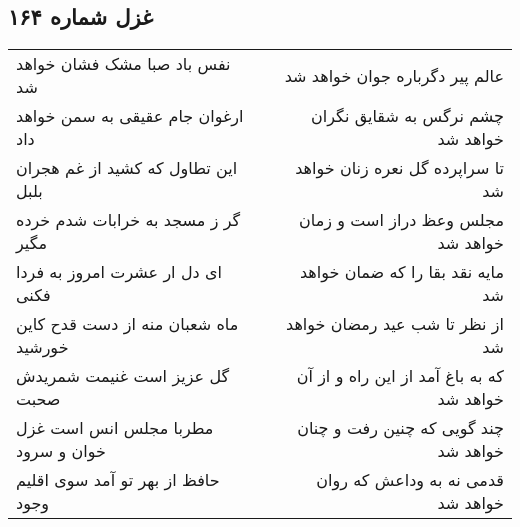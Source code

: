 \begin{center}
\section*{غزل شماره ۱۶۴}
\label{sec:sh164}
\begin{longtable}{l p{0.5cm} r}
نفس باد صبا مشک فشان خواهد شد
&&
عالم پیر دگرباره جوان خواهد شد
\\
ارغوان جام عقیقی به سمن خواهد داد
&&
چشم نرگس به شقایق نگران خواهد شد
\\
این تطاول که کشید از غم هجران بلبل
&&
تا سراپرده گل نعره زنان خواهد شد
\\
گر ز مسجد به خرابات شدم خرده مگیر
&&
مجلس وعظ دراز است و زمان خواهد شد
\\
ای دل ار عشرت امروز به فردا فکنی
&&
مایه نقد بقا را که ضمان خواهد شد
\\
ماه شعبان منه از دست قدح کاین خورشید
&&
از نظر تا شب عید رمضان خواهد شد
\\
گل عزیز است غنیمت شمریدش صحبت
&&
که به باغ آمد از این راه و از آن خواهد شد
\\
مطربا مجلس انس است غزل خوان و سرود
&&
چند گویی که چنین رفت و چنان خواهد شد
\\
حافظ از بهر تو آمد سوی اقلیم وجود
&&
قدمی نه به وداعش که روان خواهد شد
\\
\end{longtable}
\end{center}
